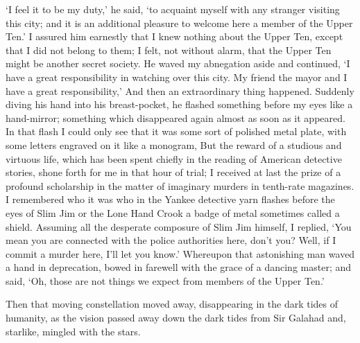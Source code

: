 \documentclass{book}
\begin{document}
‘I feel it to be my duty,’ he said, ‘to acquaint myself with any stranger visiting this city; and it is an additional pleasure to welcome here a member of the Upper Ten.’ I assured him earnestly that I knew nothing about the Upper Ten, except that I did not belong to them; I felt, not without alarm, that the Upper Ten might be another secret society. He waved my abnegation aside and continued, ‘I have a great responsibility in watching over this city. My friend the mayor and I have a great responsibility,’ And then an extraordinary thing happened. Suddenly diving his hand into his breast-pocket, he flashed something before my eyes like a hand-mirror; something which disappeared again almost as soon as it appeared. In that flash I could only see that it was some sort of polished metal plate, with some letters engraved on it like a monogram, But the reward of a studious and virtuous life, which has been spent chiefly in the reading of American detective stories, shone forth for me in that hour of trial; I received at last the prize of a profound scholarship in the matter of imaginary murders in tenth-rate magazines. I remembered who it was who in the Yankee detective yarn flashes before the eyes of Slim Jim or the Lone Hand Crook a badge of metal sometimes called a shield. Assuming all the desperate composure of Slim Jim himself, I replied, ‘You mean you are connected with the police authorities here, don’t you? Well, if I commit a murder here, I’ll let you know.’ Whereupon that astonishing man waved a hand in deprecation, bowed in farewell with the grace of a dancing master; and said, ‘Oh, those are not things we expect from members of the Upper Ten.’

Then that moving constellation moved away, disappearing in the dark tides of humanity, as the vision passed away down the dark tides from Sir Galahad and, starlike, mingled with the stars.
\end{document}
